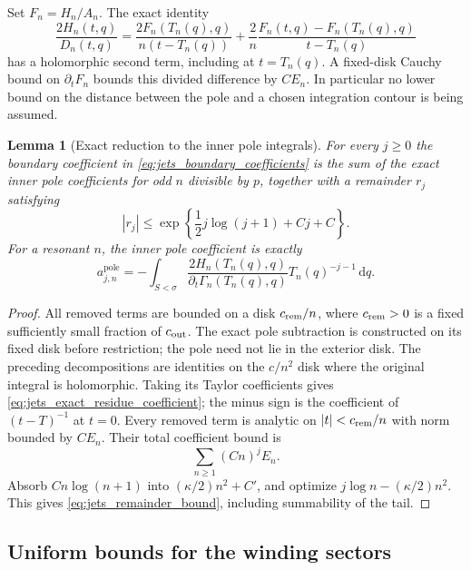 \documentclass[11pt]{article}
\numberwithin{equation}{section}
\newtheorem{lemma}[theorem]{Lemma}
\theoremstyle{definition}
\newcommand{\dd}{\,\mathrm d}
\begin{document}
Set $F_n=H_n/A_n$. The exact identity
\begin{equation}\label{eq:jets_divided_difference}
 \frac{2H_n(t,q)}{D_n(t,q)}=
 \frac{2F_n(T_n(q),q)}{n(t-T_n(q))}
 +\frac2n\frac{F_n(t,q)-F_n(T_n(q),q)}{t-T_n(q)}
\end{equation}
has a holomorphic second term, including at $t=T_n(q)$. A
fixed-disk Cauchy bound on $\partial_tF_n$ bounds this divided
difference by $CE_n$. In particular no lower bound on the distance
between the pole and a chosen integration contour is being assumed.

\begin{lemma}[Exact reduction to the inner pole integrals]
\label{lem:jets_remainder}
For every $j\ge0$ the boundary coefficient in
\eqref{eq:jets_boundary_coefficients} is the sum of the exact inner
pole coefficients for odd $n$ divisible by $p$, together with a
remainder $r_j$ satisfying
\begin{equation}\label{eq:jets_remainder_bound}
 |r_j|\le \exp\left\{\frac12j\log(j+1)+Cj+C\right\}.
\end{equation}
For a resonant $n$, the inner pole coefficient is exactly
\begin{equation}\label{eq:jets_exact_residue_coefficient}
 a_{j,n}^{\mathrm{pole}}=
 -\int_{S<\sigma}
  \frac{2H_n(T_n(q),q)}{\partial_t\Gamma_n(T_n(q),q)}
  T_n(q)^{-j-1}\dd q.
\end{equation}
\end{lemma}

\begin{proof}
All removed terms are bounded on a disk $c_{\rm rem}/n$, where
$c_{\rm rem}>0$ is a fixed sufficiently small fraction of $c_{\rm out}$.
The exact pole subtraction is constructed on its fixed disk before
restriction; the pole need not lie in the exterior disk. The preceding
decompositions are identities on the $c/n^2$ disk where the original
integral is holomorphic. Taking its Taylor
coefficients gives \eqref{eq:jets_exact_residue_coefficient}; the
minus sign is the coefficient of $(t-T)^{-1}$ at $t=0$. Every
removed term is analytic on $|t|<c_{\rm rem}/n$ with norm bounded by $CE_n$.
Their total coefficient bound is
\[
 \sum_{n\ge1}(Cn)^j E_n.
\]
Absorb $Cn\log(n+1)$ into $(\kappa/2)n^2+C'$, and optimize
$j\log n-(\kappa/2)n^2$. This gives
\eqref{eq:jets_remainder_bound}, including summability of the tail.
\end{proof}

\subsection{Uniform bounds for the winding sectors}
\end{document}
